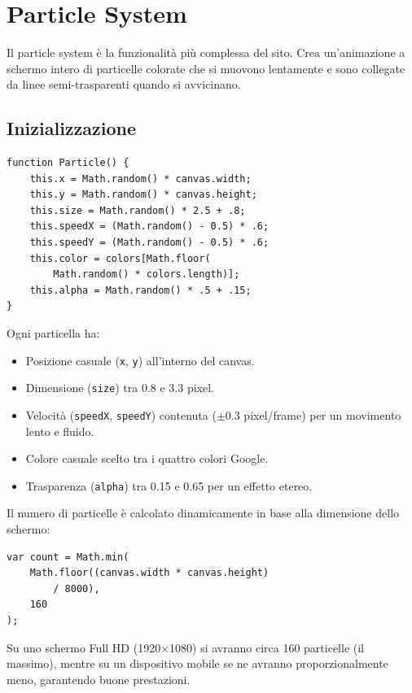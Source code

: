 \documentclass[a4paper,12pt]{report}
\begin{document}
\section{Particle System}

Il particle system \`e la funzionalit\`a pi\`u complessa del sito. Crea un'animazione a schermo intero di particelle colorate che si muovono lentamente e sono collegate da linee semi-trasparenti quando si avvicinano.

\subsection{Inizializzazione}

\begin{lstlisting}[style=jsstyle, caption={Costruttore Particle}]
function Particle() {
    this.x = Math.random() * canvas.width;
    this.y = Math.random() * canvas.height;
    this.size = Math.random() * 2.5 + .8;
    this.speedX = (Math.random() - 0.5) * .6;
    this.speedY = (Math.random() - 0.5) * .6;
    this.color = colors[Math.floor(
        Math.random() * colors.length)];
    this.alpha = Math.random() * .5 + .15;
}
\end{lstlisting}

Ogni particella ha:
\begin{itemize}[leftmargin=2cm]
    \item Posizione casuale (\texttt{x}, \texttt{y}) all'interno del canvas.
    \item Dimensione (\texttt{size}) tra 0.8 e 3.3 pixel.
    \item Velocit\`a (\texttt{speedX}, \texttt{speedY}) contenuta ($\pm 0.3$ pixel/frame) per un movimento lento e fluido.
    \item Colore casuale scelto tra i quattro colori Google.
    \item Trasparenza (\texttt{alpha}) tra 0.15 e 0.65 per un effetto etereo.
\end{itemize}

Il numero di particelle \`e calcolato dinamicamente in base alla dimensione dello schermo:

\begin{lstlisting}[style=jsstyle, caption={Calcolo numero particelle}]
var count = Math.min(
    Math.floor((canvas.width * canvas.height)
        / 8000),
    160
);
\end{lstlisting}

Su uno schermo Full HD (1920$\times$1080) si avranno circa 160 particelle (il massimo), mentre su un dispositivo mobile se ne avranno proporzionalmente meno, garantendo buone prestazioni.
\end{document}
